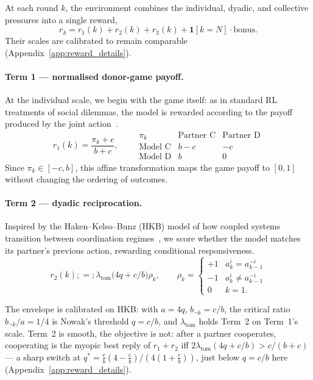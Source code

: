 \documentclass{article}
\begin{document}
At each round $k$, the environment combines the individual, dyadic, and
collective pressures into a single reward,
\begin{equation}
r_k=r_1(k)+r_2(k)+r_3(k)+\mathbf{1}[k=N]\cdot\mathrm{bonus}.
\label{eq:reward}
\end{equation}
Their scales are calibrated to remain comparable
(Appendix~\ref{app:reward_details}).

\paragraph{Term 1 --- normalised donor-game payoff.}
At the individual scale, we begin with the game itself: as in standard RL
treatments of social dilemmas, the model is rewarded according to the payoff
produced by the joint action~\citep{leibo2017}.
\begin{equation}
r_1(k)=\frac{\pi_k+c}{b+c},
\qquad
\begin{array}{c|cc}
\pi_k & \text{Partner C} & \text{Partner D} \\ \hline
\text{Model C} & b-c & -c \\
\text{Model D} & b   & 0
\end{array}
\label{eq:t1}
\end{equation}
Since $\pi_k\in[-c,b]$, this affine transformation maps the game payoff to
$[0,1]$ without changing the ordering of outcomes.

\paragraph{Term 2 --- dyadic reciprocation.}
Inspired by the Haken--Kelso--Bunz (HKB) model of how coupled systems transition between coordination regimes~\citep{haken1985hkb,kelso2012}, we score whether the model matches its partner's previous action, rewarding conditional responsiveness. 
\begin{equation}
r_2(k) ;=; \lambda_{\text{tom}}\bigl(4q + c/b\bigr)\rho_k,
\qquad
\rho_k =
\begin{cases}
+1 & a_k^{i} = a_{k-1}^{-i}\\
-1 & a_k^{i} \neq a_{k-1}^{-i}\\
0 & k = 1 .
\end{cases}
\label{eq:t2}
\end{equation}

The envelope is calibrated on HKB: with $a=4q$, $b_{\neg k}=c/b$, the critical ratio $b_{\neg k}/a=1/4$ is Nowak's threshold $q=c/b$, and $\lambda_{\text{tom}}$ holds Term~2 on Term~1's scale. Term~2 is smooth, the objective is not: after a partner cooperates, cooperating is the myopic best reply of $r_1+r_2$ iff $2\lambda_{\text{tom}}(4q+c/b)>c/(b+c)$ --- a sharp switch at $q^{*}=\tfrac{c}{b}(4-\tfrac{c}{b})/(4(1+\tfrac{c}{b}))$, just below $q=c/b$ here (Appendix~\ref{app:reward_details}).
\end{document}

